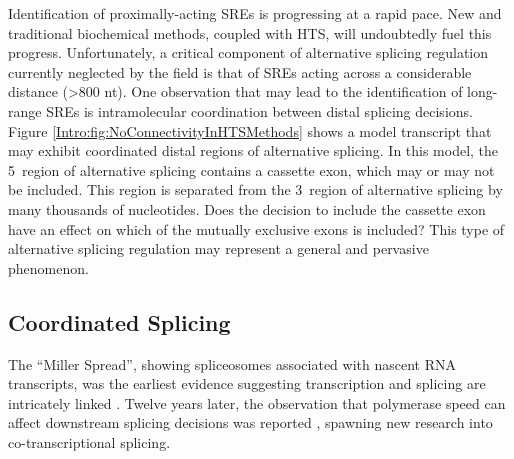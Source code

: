     Identification of proximally-acting SREs is progressing at a rapid pace. New and traditional biochemical methods, coupled with HTS, will undoubtedly fuel this progress. Unfortunately, a critical component of alternative splicing regulation currently neglected by the field is that of SREs acting across a considerable distance (>800 nt). One observation that may lead to the identification of long-range SREs is intramolecular coordination between distal splicing decisions. Figure \ref{Intro:fig:NoConnectivityInHTSMethods} shows a model transcript that may exhibit coordinated distal regions of alternative splicing. In this model, the 5\textprime~region of alternative splicing contains a cassette exon, which may or may not be included. This region is separated from the 3\textprime~region of alternative splicing by many thousands of nucleotides. Does the decision to include the cassette exon have an effect on which of the mutually exclusive exons is included? This type of alternative splicing regulation may represent a general and pervasive phenomenon.

  \subsection{Coordinated Splicing}
    \label{Intro:subsec:Coordination in splicing}

    The ``Miller Spread'', showing spliceosomes associated with nascent RNA transcripts, was the earliest evidence suggesting transcription and splicing are intricately linked \citep{Osheim1985}. Twelve years later, the observation that polymerase speed can affect downstream splicing decisions was reported \citep{Cramer1997}, spawning new research into co-transcriptional splicing.


